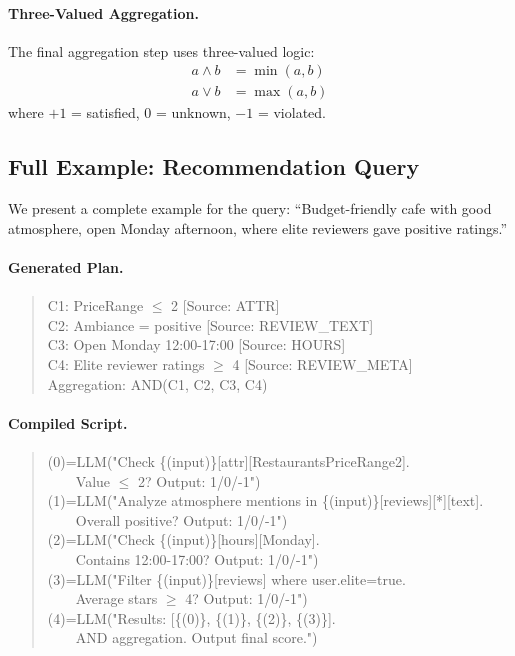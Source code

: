 \paragraph{Three-Valued Aggregation.}
The final aggregation step uses three-valued logic:
\begin{align}
    a \land b &= \min(a, b) \\
    a \lor b &= \max(a, b)
\end{align}
where $+1$ = satisfied, $0$ = unknown, $-1$ = violated.

\subsection{Full Example: Recommendation Query}

We present a complete example for the query: ``Budget-friendly cafe with good atmosphere, open Monday afternoon, where elite reviewers gave positive ratings.''

\paragraph{Generated Plan.}
\begin{quote}
\small\ttfamily
C1: PriceRange $\leq$ 2 [Source: ATTR]\\
C2: Ambiance = positive [Source: REVIEW\_TEXT]\\
C3: Open Monday 12:00-17:00 [Source: HOURS]\\
C4: Elite reviewer ratings $\geq$ 4 [Source: REVIEW\_META]\\
Aggregation: AND(C1, C2, C3, C4)
\end{quote}

\paragraph{Compiled \script Script.}
\begin{quote}
\small\ttfamily
(0)=LLM("Check \{(input)\}[attr][RestaurantsPriceRange2].\\
\ \ \ \ Value $\leq$ 2? Output: 1/0/-1")\\
(1)=LLM("Analyze atmosphere mentions in \{(input)\}[reviews][*][text].\\
\ \ \ \ Overall positive? Output: 1/0/-1")\\
(2)=LLM("Check \{(input)\}[hours][Monday].\\
\ \ \ \ Contains 12:00-17:00? Output: 1/0/-1")\\
(3)=LLM("Filter \{(input)\}[reviews] where user.elite=true.\\
\ \ \ \ Average stars $\geq$ 4? Output: 1/0/-1")\\
(4)=LLM("Results: [\{(0)\}, \{(1)\}, \{(2)\}, \{(3)\}].\\
\ \ \ \ AND aggregation. Output final score.")
\end{quote}

